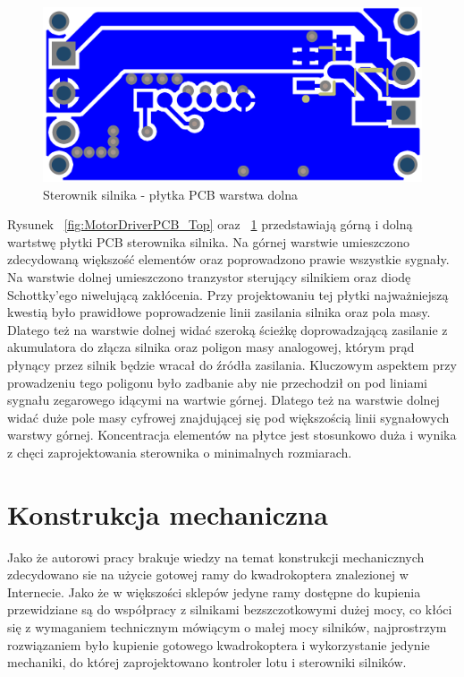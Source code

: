 \begin{figure}[H]
	\centering
	\includegraphics[scale=0.4]{Pictures/MotorDriverPCB_Bottom.png}
		\caption[Sterownik silnika - płytka PCB warstwa dolna]{Sterownik silnika - płytka PCB warstwa dolna}
	\label{fig:MotorDriverPCB_Bottom}
\end{figure}

Rysunek ~\ref{fig:MotorDriverPCB_Top} oraz ~\ref{fig:MotorDriverPCB_Bottom} przedstawiają górną i dolną wartstwę płytki PCB sterownika silnika. Na górnej warstwie umieszczono zdecydowaną większość elementów oraz poprowadzono prawie wszystkie sygnały. Na warstwie dolnej umieszczono tranzystor sterujący silnikiem oraz diodę Schottky'ego niwelującą zakłócenia. Przy projektowaniu tej płytki najważniejszą kwestią było prawidłowe poprowadzenie linii zasilania silnika oraz pola masy. Dlatego też na warstwie dolnej widać szeroką ścieżkę doprowadzającą zasilanie z akumulatora do złącza silnika oraz poligon masy analogowej, którym prąd płynący przez silnik będzie wracał do źródła zasilania. Kluczowym aspektem przy prowadzeniu tego poligonu było zadbanie aby nie przechodził on pod liniami sygnału zegarowego idącymi na wartwie górnej. Dlatego też na warstwie dolnej widać duże pole masy cyfrowej znajdującej się pod większością linii sygnałowych warstwy górnej. Koncentracja elementów na płytce jest stosunkowo duża i wynika z chęci zaprojektowania sterownika o minimalnych rozmiarach. 

\section{Konstrukcja mechaniczna}

Jako że autorowi pracy brakuje wiedzy na temat konstrukcji mechanicznych zdecydowano sie na użycie gotowej ramy do kwadrokoptera znalezionej w Internecie. Jako że w większości sklepów jedyne ramy dostępne do kupienia przewidziane są do współpracy z silnikami bezszczotkowymi dużej mocy, co kłóci się z wymaganiem technicznym mówiącym o małej mocy silników, najprostrzym rozwiązaniem było kupienie gotowego kwadrokoptera i wykorzystanie jedynie mechaniki, do której zaprojektowano kontroler lotu i sterowniki silników. 

